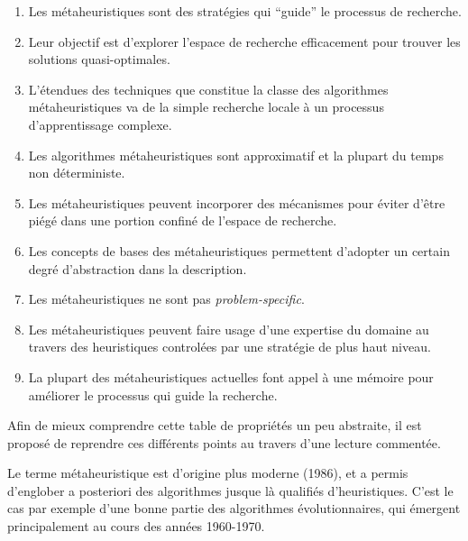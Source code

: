 \begin{enumerate}[label=(\alph*),labelindent=\parindent,leftmargin=*]
	\item Les métaheuristiques sont des stratégies qui \enquote{guide} le processus de recherche. \label{enum_meta_a}
	\item Leur objectif est d'explorer l'espace de recherche efficacement pour trouver les solutions quasi-optimales. \label{enum_meta_b}
	\item L'étendues des techniques que constitue la classe des algorithmes métaheuristiques va de la simple recherche locale à un processus d'apprentissage complexe. \label{enum_meta_c}
	\item Les algorithmes métaheuristiques sont approximatif et la plupart du temps non déterministe. \label{enum_meta_d}
	\item Les métaheuristiques peuvent incorporer des mécanismes pour éviter d'être piégé dans une portion confiné de l'espace de recherche. \label{enum_meta_e}
	\item Les concepts de bases des métaheuristiques permettent d'adopter un certain degré d'abstraction dans la description. \label{enum_meta_f}
	\item Les métaheuristiques ne sont pas \textit{problem-specific}. \label{enum_meta_g}
	\item Les métaheuristiques peuvent faire usage d'une expertise du domaine au travers des heuristiques controlées par une stratégie de plus haut niveau. \label{enum_meta_h}
	\item La plupart des métaheuristiques actuelles font appel à une mémoire pour améliorer le processus qui guide la recherche. \label{enum_meta_i}
\end{enumerate}

Afin de mieux comprendre cette table de propriétés un peu abstraite, il est proposé de reprendre ces différents points au travers d'une lecture commentée.

Le terme métaheuristique est d'origine plus moderne (1986), et a permis d'englober a posteriori des algorithmes jusque là qualifiés d'heuristiques. C'est le cas par exemple d'une bonne partie des algorithmes évolutionnaires, qui émergent principalement au cours des années 1960-1970. 

